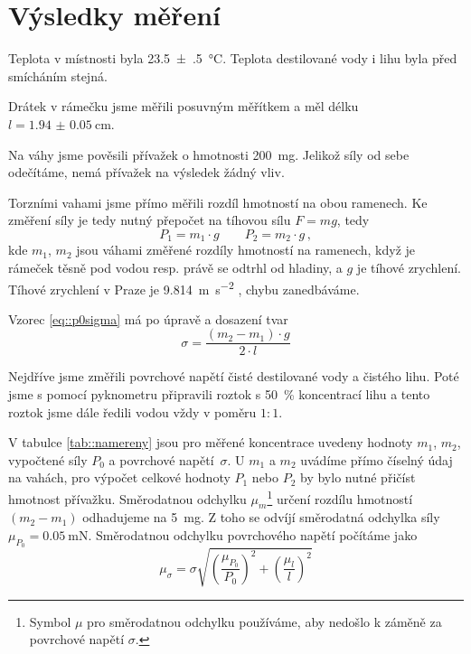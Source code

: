\section*{Výsledky měření}
Teplota v místnosti byla \SI{23.5(5)}{\degreeCelsius}.
Teplota destilované vody i lihu byla před smícháním stejná.

Drátek v rámečku jsme měřili posuvným měřítkem a měl délku $l = \SI{1.94(5)}{\cm}$.

Na váhy jsme pověsili přívažek o hmotnosti \SI{200}{\milli\g}.
Jelikož síly od sebe odečítáme, nemá přívažek na výsledek žádný vliv.

Torzními vahami jsme přímo měřili rozdíl hmotností na obou ramenech.
Ke změření síly je tedy nutný přepočet na tíhovou sílu $F = mg$, tedy
\begin{equation}
P_1 = m_1 \cdot g \qquad P_2= m_2 \cdot g \,,
\end{equation}
kde $m_1$, $m_2$ jsou váhami změřené rozdíly hmotností na ramenech, když je rámeček těsně pod vodou resp. právě se odtrhl od hladiny, a $g$ je tíhové zrychlení.
Tíhové zrychlení v Praze je \SI{9,814}{\m\per\s\squared} \cite{gravitace}, chybu zanedbáváme.

Vzorec \eqref{eq::p0sigma} má po úpravě a dosazení tvar
\begin{equation}
\sigma = \frac{(m_2-m_1)\cdot g}{2 \cdot l}
\end{equation}

Nejdříve jsme změřili povrchové napětí čisté destilované vody a čistého lihu.
Poté jsme s pomocí pyknometru připravili roztok s \SI{50}{\percent} koncentrací lihu a tento roztok jsme dále ředili vodou vždy v poměru $1:1$.

V tabulce \ref{tab::namereny} jsou pro měřené koncentrace uvedeny hodnoty $m_1$, $m_2$, vypočtené síly $P_0$ a povrchové napětí~$\sigma$.
U $m_1$ a $m_2$ uvádíme přímo číselný údaj na vahách, pro výpočet celkové hodnoty $P_1$ nebo $P_2$ by bylo nutné přičíst hmotnost přívažku.
Směrodatnou odchylku $\mu_m$\footnote{Symbol $\mu$ pro směrodatnou odchylku používáme, aby nedošlo k záměně za povrchové napětí $\sigma$.} určení rozdílu hmotností $(m_2-m_1)$ odhadujeme na \SI{5}{\milli \g}.
Z toho se odvíjí směrodatná odchylka síly $\mu_{P_0} = \SI{0.05}{\milli \newton}$.
Směrodatnou odchylku povrchového napětí počítáme jako
\begin{equation}
\mu_\sigma = \sigma \sqrt{ \left(  \frac{\mu_{P_0}}{P_0} \right)^2 +
\left(  \frac{\mu_{l}}{l} \right)^2   }
\end{equation}

